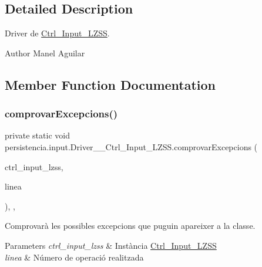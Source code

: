 \subsection{Detailed Description}
Driver de \hyperlink{classpersistencia_1_1input_1_1Ctrl__Input__LZSS}{Ctrl\+\_\+\+Input\+\_\+\+L\+Z\+SS}. 

\begin{DoxyAuthor}{Author}
Manel Aguilar 
\end{DoxyAuthor}


\subsection{Member Function Documentation}
\mbox{\label{classpersistencia_1_1input_1_1Driver____Ctrl__Input__LZSS_a221f978664fc97bdab3b18d3c5f55155}} 
\subsubsection{\texorpdfstring{comprovar\+Excepcions()}{comprovarExcepcions()}}
{\footnotesize\ttfamily private static void persistencia.\+input.\+Driver\+\_\+\+\_\+\+Ctrl\+\_\+\+Input\+\_\+\+L\+Z\+S\+S.\+comprovar\+Excepcions (\begin{DoxyParamCaption}\item[{\hyperlink{classpersistencia_1_1input_1_1Ctrl__Input__LZSS}{Ctrl\+\_\+\+Input\+\_\+\+L\+Z\+SS}}]{ctrl\+\_\+input\+\_\+lzss,  }\item[{String}]{linea }\end{DoxyParamCaption})\hspace{0.3cm}{\ttfamily [inline]}, {\ttfamily [static]}, {\ttfamily [private]}}



Comprovarà les possibles excepcions que puguin apareixer a la classe. 


\begin{DoxyParams}{Parameters}
{\em ctrl\+\_\+input\+\_\+lzss} & Instància \hyperlink{classpersistencia_1_1input_1_1Ctrl__Input__LZSS}{Ctrl\+\_\+\+Input\+\_\+\+L\+Z\+SS} \\
\hline
{\em linea} & Número de operació realitzada \\
\hline
\end{DoxyParams}

